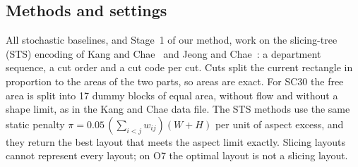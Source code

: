 

\subsection{Methods and settings}
\label{sec:bx-methods}

All stochastic baselines, and Stage~1 of our method, work on the slicing-tree (STS) encoding
of Kang and Chae~\cite{kang2017} and Jeong and Chae~\cite{jeong2026}: a department sequence, a cut order and
a cut code per cut. Cuts split the current rectangle in proportion to the areas of the two parts, so areas are
exact. For SC30 the free area is split into 17 dummy blocks of equal area, without flow and without a shape
limit, as in the Kang and Chae data file. The STS methods use the same static penalty
$\pi=0.05\,(\sum_{i<j}w_{ij})(W+H)$ per unit of aspect excess, and they return the best layout that meets
the aspect limit exactly. Slicing layouts cannot represent every layout; on O7 the optimal layout is not a slicing
layout.

